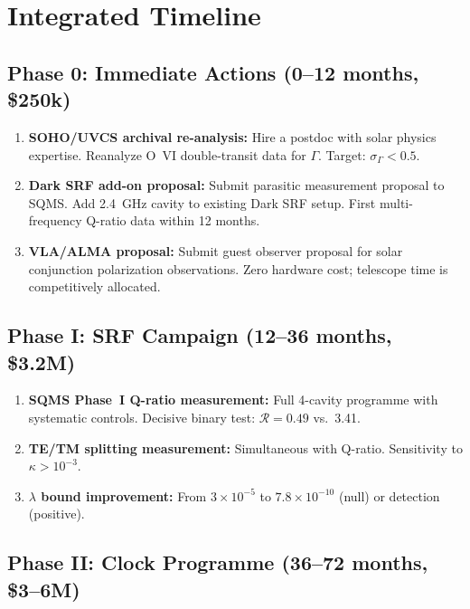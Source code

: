 \documentclass[11pt]{article}
\newcommand{\ee}[1]{\times 10^{#1}}
\begin{document}
\section{Integrated Timeline}
\label{sec:timeline}

\subsection{Phase 0: Immediate Actions (0--12 months, \$250k)}

\begin{enumerate}
\item \textbf{SOHO/UVCS archival re-analysis:}  Hire a postdoc with
solar physics expertise.  Reanalyze O~VI double-transit data for
$\Gamma$.  Target: $\sigma_\Gamma < 0.5$.

\item \textbf{Dark SRF add-on proposal:}  Submit parasitic measurement
proposal to SQMS.  Add 2.4~GHz cavity to existing Dark SRF setup.
First multi-frequency Q-ratio data within 12 months.

\item \textbf{VLA/ALMA proposal:}  Submit guest observer proposal for
solar conjunction polarization observations.  Zero hardware cost;
telescope time is competitively allocated.
\end{enumerate}

\subsection{Phase I: SRF Campaign (12--36 months, \$3.2M)}

\begin{enumerate}
\item \textbf{SQMS Phase~I Q-ratio measurement:}  Full 4-cavity
programme with systematic controls.  Decisive binary test:
$\mathcal{R} = 0.49$ vs.\ 3.41.

\item \textbf{TE/TM splitting measurement:}  Simultaneous with
Q-ratio.  Sensitivity to $\kappa > 10^{-3}$.

\item \textbf{$\lambda$ bound improvement:}  From $3\ee{-5}$ to
$7.8\ee{-10}$ (null) or detection (positive).
\end{enumerate}

\subsection{Phase II: Clock Programme (36--72 months, \$3--6M)}
\end{document}
